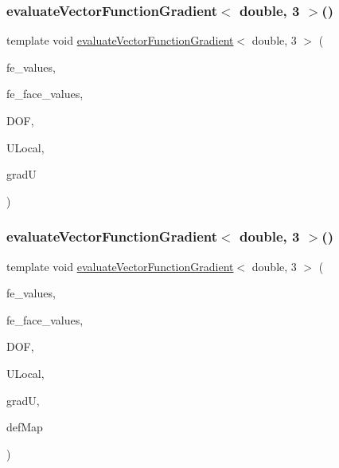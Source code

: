 \mbox{\label{function_evaluations_8cc_aa2d12bff0463147f781bf71f070705cc}} 
\subsubsection{\texorpdfstring{evaluateVectorFunctionGradient$<$ double, 3 $>$()}{evaluateVectorFunctionGradient< double, 3 >()}\hspace{0.1cm}{\footnotesize\ttfamily [3/4]}}
{\footnotesize\ttfamily template void \mbox{\hyperlink{group___evaluation_functions_ga9608539d601a91aff1ba01ccc720fbe0}{evaluate\+Vector\+Function\+Gradient}}$<$ double, 3 $>$ (\begin{DoxyParamCaption}\item[{const F\+E\+Values$<$ 3 $>$ \&}]{fe\+\_\+values,  }\item[{const F\+E\+Face\+Values$<$ 3 $>$ \&}]{fe\+\_\+face\+\_\+values,  }\item[{unsigned int}]{D\+OF,  }\item[{Table$<$ 1, double $>$ \&}]{U\+Local,  }\item[{Table$<$ 3, double $>$ \&}]{gradU }\end{DoxyParamCaption})}

\mbox{\label{function_evaluations_8cc_a9aaa007fb989c138e170beb650e31c31}} 
\subsubsection{\texorpdfstring{evaluateVectorFunctionGradient$<$ double, 3 $>$()}{evaluateVectorFunctionGradient< double, 3 >()}\hspace{0.1cm}{\footnotesize\ttfamily [4/4]}}
{\footnotesize\ttfamily template void \mbox{\hyperlink{group___evaluation_functions_ga9608539d601a91aff1ba01ccc720fbe0}{evaluate\+Vector\+Function\+Gradient}}$<$ double, 3 $>$ (\begin{DoxyParamCaption}\item[{const F\+E\+Values$<$ 3 $>$ \&}]{fe\+\_\+values,  }\item[{const F\+E\+Face\+Values$<$ 3 $>$ \&}]{fe\+\_\+face\+\_\+values,  }\item[{unsigned int}]{D\+OF,  }\item[{Table$<$ 1, double $>$ \&}]{U\+Local,  }\item[{Table$<$ 3, double $>$ \&}]{gradU,  }\item[{\mbox{\hyperlink{structdeformation_map}{deformation\+Map}}$<$ double, 3 $>$ \&}]{def\+Map }\end{DoxyParamCaption})}

